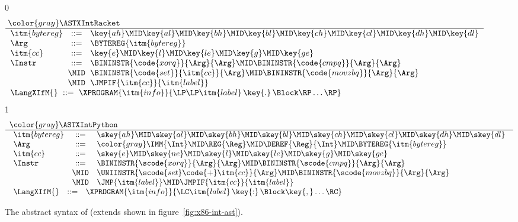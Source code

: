 \documentclass[7x10]{TimesAPriori_MIT}%
\newcommand{\gray}[1]{{\color{gray} #1}}
\def\racketEd{0}
\def\pythonEd{1}
\def\edition{1}
\newcommand{\pythonColor}[0]{}
\newcommand{\python}[1]{{\if\edition\pythonEd\pythonColor #1\fi}}
\numberwithin{theorem}{chapter}
\numberwithin{definition}{chapter}
\numberwithin{equation}{chapter}
\begin{document}
\newcommand{\ASTXIfRacket}{
\begin{array}{lcl}
\itm{bytereg} &::=& \key{ah} \MID \key{al} \MID \key{bh} \MID \key{bl}
    \MID \key{ch} \MID \key{cl} \MID \key{dh} \MID \key{dl} \\
\Arg &::=&  \BYTEREG{\itm{bytereg}} \\
\itm{cc} & ::= & \key{e} \MID \key{l} \MID \key{le} \MID \key{g} \MID \key{ge} \\
\Instr &::=& \BININSTR{\code{xorq}}{\Arg}{\Arg}
       \MID \BININSTR{\code{cmpq}}{\Arg}{\Arg}\\
       &\MID& \BININSTR{\code{set}}{\itm{cc}}{\Arg} 
       \MID \BININSTR{\code{movzbq}}{\Arg}{\Arg}\\
       &\MID&  \JMPIF{\itm{cc}}{\itm{label}} 
\end{array}
}

\newcommand{\ASTXIfPython}{
\begin{array}{lcl}
\itm{bytereg} &::=& \skey{ah} \MID \skey{al} \MID \skey{bh} \MID \skey{bl}
    \MID \skey{ch} \MID \skey{cl} \MID \skey{dh} \MID \skey{dl} \\
\Arg &::=&  \gray{\IMM{\Int} \MID \REG{\Reg} \MID \DEREF{\Reg}{\Int}} 
     \MID \BYTEREG{\itm{bytereg}} \\
\itm{cc} & ::= & \skey{e} \MID \skey{ne} \MID \skey{l} \MID \skey{le} \MID \skey{g} \MID \skey{ge} \\
\Instr &::=& \BININSTR{\scode{xorq}}{\Arg}{\Arg}
       \MID \BININSTR{\scode{cmpq}}{\Arg}{\Arg}\\
       &\MID& \UNIINSTR{\scode{set}\code{+}\itm{cc}}{\Arg} 
       \MID \BININSTR{\scode{movzbq}}{\Arg}{\Arg}\\
       &\MID&  \python{\JMP{\itm{label}}} \MID \JMPIF{\itm{cc}}{\itm{label}} 
\end{array}
}

\begin{figure}[tp]
\begin{tcolorbox}[colback=white]
\small    
{\if\edition\racketEd    
\[\arraycolsep=3pt
\begin{array}{l}
  \gray{\ASTXIntRacket} \\ \hline
  \ASTXIfRacket \\
\begin{array}{lcl}
\LangXIfM{} &::= & \XPROGRAM{\itm{info}}{\LP\LP\itm{label} \,\key{.}\, \Block \RP\ldots\RP}
\end{array}
\end{array}
\]
\fi}
%
{\if\edition\pythonEd\pythonColor
\[
\begin{array}{l}
  \gray{\ASTXIntPython} \\ \hline
  \ASTXIfPython \\
\begin{array}{lcl}
\LangXIfM{} &::= & \XPROGRAM{\itm{info}}{\LC\itm{label} \,\key{:}\, \Block \key{,} \ldots \RC }
\end{array}
\end{array}
\]
\fi}
\end{tcolorbox}
\caption{The abstract syntax of \LangXIf{} (extends \LangXInt{} shown in figure~\ref{fig:x86-int-ast}).}
\label{fig:x86-1}
\end{figure}
\end{document}
